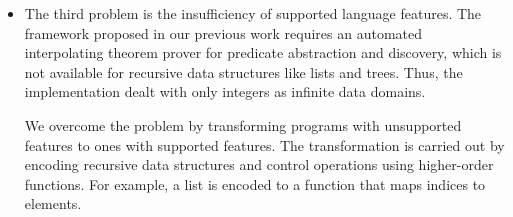 \begin{itemize}
%


%
%

\item
The third problem is the insufficiency of supported language features.
The framework proposed in our previous work
requires an automated interpolating theorem prover for predicate
abstraction and discovery, which is not available for recursive
data structures like lists and trees. Thus, the implementation dealt
with only integers as infinite data domains.

We overcome the problem by transforming programs with unsupported
features to ones with supported features.  The transformation is carried
out by encoding recursive data structures and control operations using
higher-order functions.  For example, a list is encoded to a function
that maps indices to elements.
\end{itemize}


